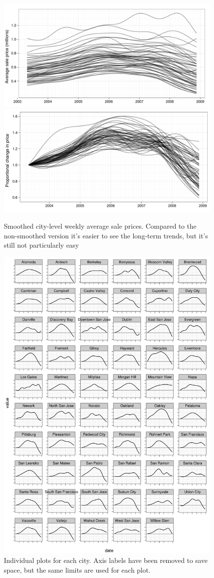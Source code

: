 \documentclass[oneside]{article}
\begin{document}
\begin{figure}[htbp]
  \centering
  \includegraphics[width=0.5 \linewidth]{cities-smooth}%
  \includegraphics[width=0.5 \linewidth]{cities-indexed}
  \caption{Smoothed city-level weekly average sale prices.  Compared to the non-smoothed version it's easier to see the long-term trends, but it's still not particularly easy}
  \label{fig:smoothed}
\end{figure}

\begin{figure}[htbp]
  \centering
  \includegraphics[width=0.9 \linewidth]{cities-individual}
  \caption{Individual plots for each city.  Axis labels have been removed to save space, but the same limits are used for each plot.}
  \label{fig:individual}
\end{figure}
\end{document}
